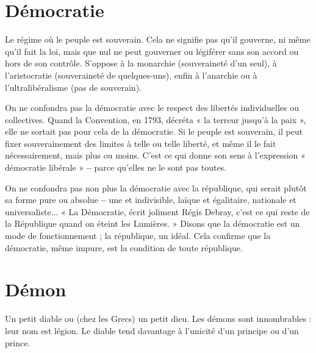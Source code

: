 \section{Démocratie}
Le régime où le peuple est souverain. Cela ne signifie pas
qu’il gouverne, ni même qu’il fait la loi, mais que nul ne
peut gouverner ou légiférer sans son accord ou hors de son contrôle. S’oppose
à la monarchie (souveraineté d’un seul), à l’aristocratie (souveraineté de
quelques-uns), enfin à l'anarchie ou à l’ultralibéralisme (pas de souverain).

On ne confondra pas la démocratie avec le respect des libertés individuelles
ou collectives. Quand la Convention, en 1793, décréta « la terreur jusqu’à la
paix », elle ne sortait pas pour cela de la démocratie. Si le peuple est souverain,
il peut fixer souverainement des limites à telle ou telle liberté, et même il le fait
nécessairement, mais plus ou moins. C’est ce qui donne son sens à l'expression
« démocratie libérale » {\bf --} parce qu’elles ne le sont pas toutes.

On ne confondra pas non plus la démocratie avec la république, qui serait
plutôt sa forme pure ou absolue {\bf --} une et indivisible, laïque et égalitaire, nationale
et universaliste... « La Démocratie, écrit joliment Régis Debray, c’est ce
qui reste de la République quand on éteint les Lumières. » Disons que la démocratie
est un mode de fonctionnement ; la république, un idéal. Cela confirme
que la démocratie, même impure, est la condition de toute république.

\section{Démon}
Un petit diable ou (chez les Grecs) un petit dieu. Les démons sont
innombrables : leur nom est légion. Le diable tend davantage à
l'unicité d’un principe ou d’un prince.

